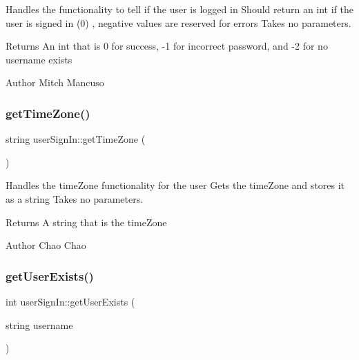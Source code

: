 Handles the functionality to tell if the user is logged in  Should return an int if the user is signed in (0) , negative values are reserved for errors  Takes no parameters. 

\begin{DoxyReturn}{Returns}
An int that is 0 for success, -\/1 for incorrect password, and -\/2 for no username exists 
\end{DoxyReturn}
\begin{DoxyAuthor}{Author}
Mitch Mancuso 
\end{DoxyAuthor}
\mbox{\label{classuser_sign_in_ae12adda30b996b9b72f1df55c93f2d2c}} 
\subsubsection{\texorpdfstring{get\+Time\+Zone()}{getTimeZone()}}
{\footnotesize\ttfamily string user\+Sign\+In\+::get\+Time\+Zone (\begin{DoxyParamCaption}{ }\end{DoxyParamCaption})}



Handles the time\+Zone functionality for the user  Gets the time\+Zone and stores it as a string  Takes no parameters. 

\begin{DoxyReturn}{Returns}
A string that is the time\+Zone 
\end{DoxyReturn}
\begin{DoxyAuthor}{Author}
Chao Chao 
\end{DoxyAuthor}
\mbox{\label{classuser_sign_in_a6c80ee2fa758b708c3a1e660601d700f}} 
\subsubsection{\texorpdfstring{get\+User\+Exists()}{getUserExists()}}
{\footnotesize\ttfamily int user\+Sign\+In\+::get\+User\+Exists (\begin{DoxyParamCaption}\item[{string}]{username }\end{DoxyParamCaption})}



